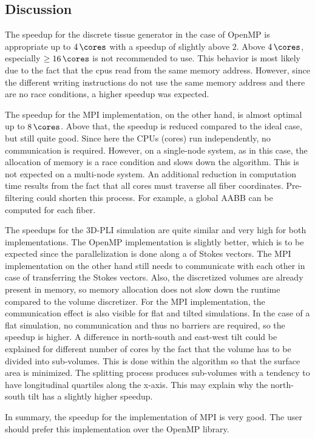 \subsection{Discussion}
%
The speedup for the discrete tissue generator in the case of \ac{OpenMP} is appropriate up to $\SI{4}{\cores}$ with a speedup of slightly above $\num{2}$.
Above $\SI{4}{\cores}$, especially $\geq \SI{16}{\cores}$ is not recommended to use.
This behavior is most likely due to the fact that the cpus read from the same memory address.
However, since the different writing instructions do not use the same memory address and there are no race conditions, a higher speedup was expected.
\par
% 
The speedup for the \ac{MPI} implementation, on the other hand, is almost optimal up to $\SI{8}{\cores}$.
Above that, the speedup is reduced compared to the ideal case, but still quite good.
Since here the \acp{CPU} (cores) run independently, no communication is required.
However, on a single-node system, as in this case, the allocation of memory is a race condition and slows down the algorithm.
This is not expected on a multi-node system.
An additional reduction in computation time results from the fact that all cores must traverse all fiber coordinates.
Pre-filtering could shorten this process.
For example, a global \ac{AABB} can be computed for each fiber.
\par
% 
The speedups for the \ac{3D-PLI} simulation are quite similar and very high for both implementations.
The \ac{OpenMP} implementation is slightly better, which is to be expected since the parallelization is done along a  of Stokes vectors.
The \ac{MPI} implementation on the other hand still needs to communicate with each other in case of transferring the Stokes vectors.
Also, the discretized volumes are already present in memory, so memory allocation does not slow down the runtime compared to the volume discretizer.
For the \ac{MPI} implementation, the communication effect is also visible for flat and tilted simulations.
In the case of a flat simulation, no communication and thus no barriers are required, so the speedup is higher.
A difference in north-south and east-west tilt could be explained for different number of cores by the fact that the volume has to be divided into sub-volumes.
This is done within the algorithm so that the surface area is minimized.
The splitting process produces sub-volumes with a tendency to have longitudinal quartiles along the x-axis.
This may explain why the north-south tilt has a slightly higher speedup.
\par
%
In summary, the speedup for the implementation of \ac{MPI} is very good.
The user should prefer this implementation over the \ac{OpenMP} library.
% 
